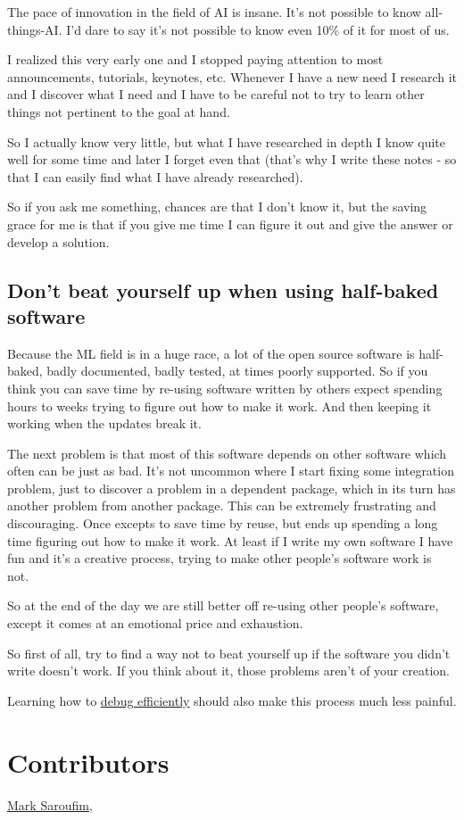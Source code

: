 \documentclass[
]{report}
\begin{document}
The pace of innovation in the field of AI is insane. It's not possible
to know all-things-AI. I'd dare to say it's not possible to know even
10\% of it for most of us.

I realized this very early one and I stopped paying attention to most
announcements, tutorials, keynotes, etc. Whenever I have a new need I
research it and I discover what I need and I have to be careful not to
try to learn other things not pertinent to the goal at hand.

So I actually know very little, but what I have researched in depth I
know quite well for some time and later I forget even that (that's why I
write these notes - so that I can easily find what I have already
researched).

So if you ask me something, chances are that I don't know it, but the
saving grace for me is that if you give me time I can figure it out and
give the answer or develop a solution.

\subsection{Don't beat yourself up when using half-baked
software}\label{dont-beat-yourself-up-when-using-half-baked-software}

Because the ML field is in a huge race, a lot of the open source
software is half-baked, badly documented, badly tested, at times poorly
supported. So if you think you can save time by re-using software
written by others expect spending hours to weeks trying to figure out
how to make it work. And then keeping it working when the updates break
it.

The next problem is that most of this software depends on other software
which often can be just as bad. It's not uncommon where I start fixing
some integration problem, just to discover a problem in a dependent
package, which in its turn has another problem from another package.
This can be extremely frustrating and discouraging. Once excepts to save
time by reuse, but ends up spending a long time figuring out how to make
it work. At least if I write my own software I have fun and it's a
creative process, trying to make other people's software work is not.

So at the end of the day we are still better off re-using other people's
software, except it comes at an emotional price and exhaustion.

So first of all, try to find a way not to beat yourself up if the
software you didn't write doesn't work. If you think about it, those
problems aren't of your creation.

Learning how to
\href{https://github.com/stas00/the-art-of-debugging/tree/master/methodology}{debug
efficiently} should also make this process much less painful.

\section{Contributors}\label{contributors}

\href{https://github.com/msaroufim}{Mark Saroufim},
\end{document}
